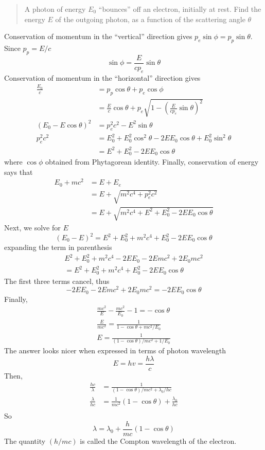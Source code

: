 \documentclass[../../main.tex]{subfiles}
\begin{document}
\begin{quote}
    A photon of energy $E_0$ “bounces” off an electron, initially at rest. Find the energy $E$ of the outgoing photon, as a function of the scattering angle $\theta$ 
\end{quote}
Conservation of momentum in the “vertical” direction gives $p_e \sin \phi = p_p \sin \theta$. Since $p_p = E/c$
\begin{equation*}
    \sin \phi=\frac{E}{c p_e}\sin \theta
\end{equation*}
Conservation of momentum in the “horizontal” direction gives
\begin{align*}
    \frac{E_0}{c}&=p_p \cos \theta + p_e \cos \phi\\
    &=\frac{E}{c}\cos \theta+ p_e \sqrt{1-(\frac{E}{c p_e}\sin \theta)^2}\\
    (E_0-E\cos\theta)^2&=p_e^2c^2-E^2\sin\theta\\
    p_e^2c^2&=E_0^2+E_0^2\cos^2\theta-2EE_0\cos\theta+E_0^2\sin^2\theta\\
    &=E^2+E_0^2-2EE_0\cos\theta
\end{align*}
where $ \cos \phi$ obtained from Phytagorean identity. Finally, conservation of energy says that
\begin{align*}
    E_0 + mc^2& = E + E_e \\
    &=E+ \sqrt{m^2c^4 + p^2_e c^2}\\
    &=E+ \sqrt{m^2c^4 + E^2+E_0^2-2EE_0\cos\theta}
\end{align*}
Next, we solve for $E$
\begin{equation*}
    (E_0-E)^2=E^2 + E_0^2 + m^2c^4 +E_0^2-2EE_0\cos\theta
\end{equation*}
expanding the term in parenthesis
\begin{multline*}
    E^2 + E_0^2 + m^2c^4 - 2EE_0-2Emc^2 + 2E_0mc^2\\=E^2 + E_0^2 + m^2c^4 +E_0^2-2EE_0\cos\theta
\end{multline*}
The first three terms cancel, thus
\begin{equation*}
    - 2EE_0-2Emc^2 + 2E_0mc^2=-2EE_0\cos\theta
\end{equation*}
Finally,
\begin{align*}
    \frac{mc^2}{E}-\frac{mc^2}{E_0}-1=-\cos\theta\\
    \frac{E}{mc^2}=\frac{1}{1-\cos\theta+mc^2/E_0}\\
    E=\frac{1}{(1-\cos\theta)/mc^2+1/E_0}
\end{align*}
The answer looks nicer when expressed in terms of photon wavelength
\begin{equation*}
    E=hv=\frac{h\lambda}{c}
\end{equation*}
Then,
\begin{align*}
    \frac{hc}{\lambda}&=\frac{1}{(1-\cos\theta)/mc^2+\lambda_0/hc}\\
    \frac{\lambda}{hc}&=\frac{1}{mc^2}(1-\cos\theta)+\frac{\lambda_0}{hc}\\
\end{align*}
So
\begin{equation*}
    \lambda=\lambda_0+\frac{h}{mc}(1-\cos\theta)
\end{equation*}
The quantity $ (h/mc)$ is called the Compton wavelength of the electron. 
\end{document}
